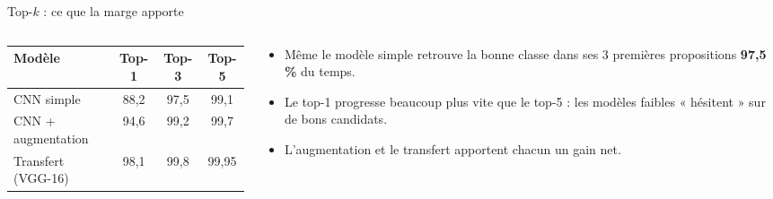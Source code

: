 \begin{frame}{Top-$k$ : ce que la marge apporte}
\begin{columns}[t]
\begin{column}{0.50\textwidth}
\begin{center}
\footnotesize
\begin{tabular}{@{}lccc@{}}
\toprule
\textbf{Modèle} & \textbf{Top-1} & \textbf{Top-3} & \textbf{Top-5} \\
\midrule
CNN simple             & 88,2 & 97,5 & 99,1 \\
CNN + augmentation     & 94,6 & 99,2 & 99,7 \\
Transfert (VGG-16)     & 98,1 & 99,8 & 99,95 \\
\bottomrule
\end{tabular}
\end{center}
\end{column}
\begin{column}{0.46\textwidth}
\begin{itemize}
  \item Même le modèle simple retrouve la bonne classe dans ses 3 premières
  propositions \textbf{97,5 \%} du temps.
  \item Le top-1 progresse beaucoup plus vite que le top-5 : les modèles
  faibles « hésitent » sur de bons candidats.
  \item L'augmentation et le transfert apportent chacun un gain net.
\end{itemize}
\end{column}
\end{columns}
\end{frame}

